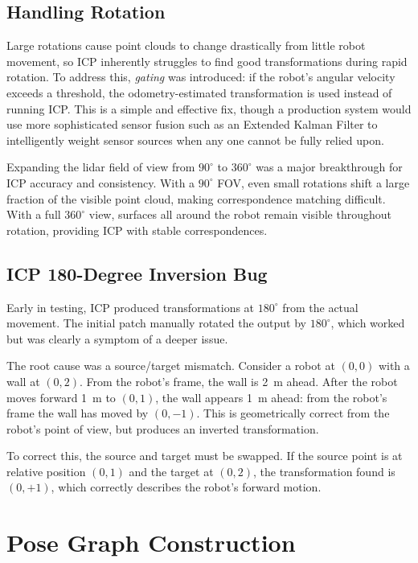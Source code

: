 \documentclass[12pt]{report}
\begin{document}
\section{Handling Rotation}
\label{sec:icp_rotation}

Large rotations cause point clouds to change drastically from little robot movement, so ICP
inherently struggles to find good transformations during rapid rotation.
To address this, \textit{gating} was introduced: if the robot's angular velocity exceeds a threshold,
the odometry-estimated transformation is used instead of running ICP.
This is a simple and effective fix, though a production system would use more sophisticated sensor
fusion such as an Extended Kalman Filter to intelligently weight sensor sources when any one cannot be
fully relied upon.

Expanding the lidar field of view from $90^\circ$ to $360^\circ$ was a major breakthrough for ICP
accuracy and consistency.
With a $90^\circ$ FOV, even small rotations shift a large fraction of the visible point cloud,
making correspondence matching difficult.
With a full $360^\circ$ view, surfaces all around the robot remain visible throughout rotation,
providing ICP with stable correspondences.

\section{ICP 180-Degree Inversion Bug}

Early in testing, ICP produced transformations at $180^\circ$ from the actual movement.
The initial patch manually rotated the output by $180^\circ$, which worked but was clearly a symptom
of a deeper issue.

The root cause was a source/target mismatch.
Consider a robot at $(0,0)$ with a wall at $(0,2)$.
From the robot's frame, the wall is 2~m ahead.
After the robot moves forward 1~m to $(0,1)$, the wall appears 1~m ahead: from the robot's frame the
wall has moved by $(0,-1)$.
This is geometrically correct from the robot's point of view, but produces an inverted transformation.

To correct this, the source and target must be swapped.
If the source point is at relative position $(0,1)$ and the target at $(0,2)$, the transformation
found is $(0,+1)$, which correctly describes the robot's forward motion.




\chapter{Pose Graph Construction}
\end{document}

